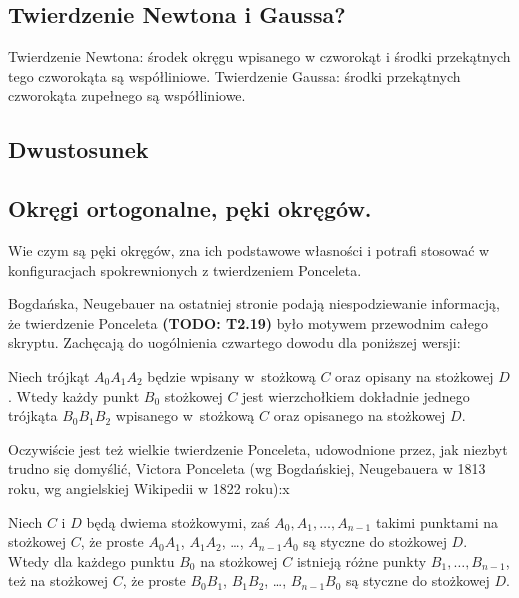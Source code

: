 \subsection{Twierdzenie Newtona i Gaussa?}
Twierdzenie Newtona: środek okręgu wpisanego w czworokąt i środki przekątnych tego czworokąta są współliniowe.
Twierdzenie Gaussa: środki przekątnych czworokąta zupełnego są współliniowe.

\subsection{Dwustosunek}

\subsection{Okręgi ortogonalne, pęki okręgów.}
Wie czym są pęki okręgów, zna ich podstawowe własności i potrafi stosować w konfiguracjach spokrewnionych z twierdzeniem Ponceleta.   


Bogdańska, Neugebauer \cite[s. 267]{neugebauer_2018} na ostatniej stronie podają niespodziewanie informacją, że twierdzenie Ponceleta {\color{red}\textbf{(TODO: T2.19)}\color{black}} było motywem przewodnim całego skryptu.
Zachęcają do uogólnienia czwartego dowodu dla poniższej wersji:

\begin{theorem}
	Niech trójkąt $A_0 A_1 A_2$ będzie wpisany w~stożkową $C$ oraz opisany na stożkowej $D$.
	Wtedy każdy punkt $B_0$ stożkowej $C$ jest wierzchołkiem dokładnie jednego trójkąta $B_0 B_1 B_2$ wpisanego w~stożkową $C$ oraz opisanego na stożkowej $D$.
\end{theorem}

Oczywiście jest też wielkie twierdzenie Ponceleta, udowodnione przez, jak niezbyt trudno się domyślić, Victora Ponceleta \cite[s. 311-317]{poncelet_1865} (wg Bogdańskiej, Neugebauera w 1813 roku, wg angielskiej Wikipedii w 1822 roku):x

\begin{theorem}
	Niech $C$ i $D$ będą dwiema stożkowymi, zaś $A_0, A_1, \ldots, A_{n-1}$ takimi punktami na stożkowej $C$, że proste $A_0A_1$, $A_1A_2$, \ldots, $A_{n-1}A_0$ są styczne do stożkowej $D$.
	Wtedy dla każdego punktu $B_0$ na stożkowej $C$ istnieją różne punkty $B_1, \ldots, B_{n-1}$, też na stożkowej $C$, że proste $B_0B_1$, $B_1B_2$, \ldots, $B_{n-1}B_0$ są styczne do stożkowej $D$.
\end{theorem}

